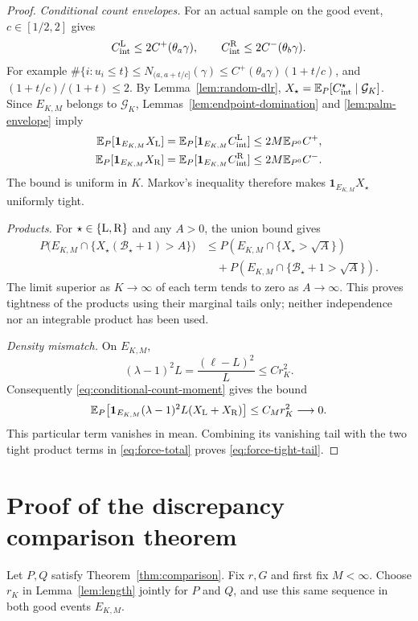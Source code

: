 \documentclass[11pt,reqno]{amsart}
\numberwithin{equation}{section}
\theoremstyle{definition}
\theoremstyle{remark}
\newcommand{\E}{\mathbb E}
\newcommand{\1}{\mathbf 1}
\newcommand{\calB}{\mathcal B}
\newcommand{\calG}{\mathcal G}
\begin{document}
\begin{proof}
\emph{Conditional count envelopes.}
For an actual sample on the good event, $c\in[1/2,2]$ gives
\[
C_{\rm int}^{\rm L}\le2C^+(\theta_a\gamma),\qquad
C_{\rm int}^{\rm R}\le2C^-(\theta_b\gamma).
\]
For example $\#\{i:u_i\le t\}\le
N_{(a,a+t/c]}(\gamma)\le C^+(\theta_a\gamma)(1+t/c)$,
and $(1+t/c)/(1+t)\le2$. By Lemma~\ref{lem:random-dlr},
$X_\star=\E_P[C_{\rm int}^\star\mid\calG_K]$. Since $E_{K,M}$ belongs
to $\calG_K$, Lemmas~\ref{lem:endpoint-domination} and
\ref{lem:palm-envelope} imply
\begin{equation}\label{eq:conditional-count-moment}
\begin{aligned}
\E_P[\1_{E_{K,M}}X_{\rm L}]
 &=\E_P[\1_{E_{K,M}}C_{\rm int}^{\rm L}]
 \le2M\E_{P^0}C^+,\\
\E_P[\1_{E_{K,M}}X_{\rm R}]
 &=\E_P[\1_{E_{K,M}}C_{\rm int}^{\rm R}]
 \le2M\E_{P^0}C^-.
\end{aligned}
\end{equation}
The bound is uniform in $K$. Markov's inequality therefore makes
$\1_{E_{K,M}}X_\star$ uniformly tight.

\emph{Products.}
For $\star\in\{{\rm L},{\rm R}\}$ and any $A>0$, the union bound gives
\begin{align*}
P\bigl(E_{K,M}\cap\{X_\star(\calB_\star+1)>A\}\bigr)
&\le P(E_{K,M}\cap\{X_\star>\sqrt A\})\\
&\quad+P(E_{K,M}\cap\{\calB_\star+1>\sqrt A\}).
\end{align*}
The limit superior as $K\to\infty$ of each term tends to zero as
$A\to\infty$. This
proves tightness of the products using their marginal tails only;
neither independence nor an integrable product has been used.

\emph{Density mismatch.}
On $E_{K,M}$,
\[
(\lambda-1)^2L=\frac{(\ell-L)^2}{L}\le Cr_K^2.
\]
Consequently \eqref{eq:conditional-count-moment} gives the bound
\[
\E_P\bigl[\1_{E_{K,M}}(\lambda-1)^2L(X_{\rm L}+X_{\rm R})\bigr]
\le C_Mr_K^2\longrightarrow0.
\]
This particular term vanishes in mean. Combining its vanishing tail
with the two tight product terms in \eqref{eq:force-total} proves
\eqref{eq:force-tight-tail}.
\end{proof}

\section{Proof of the discrepancy comparison theorem}
\label{sec:proof-main}

Let $P,Q$ satisfy Theorem~\ref{thm:comparison}. Fix $r,G$ and first fix
$M<\infty$. Choose $r_K$ in Lemma~\ref{lem:length} jointly for $P$ and
$Q$, and use this same sequence in both good events $E_{K,M}$.
\end{document}
